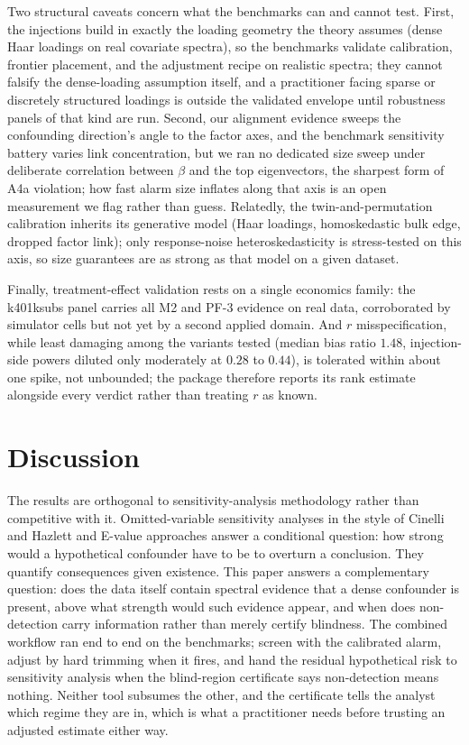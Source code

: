Two structural caveats concern what the benchmarks can and cannot test. First, the injections build in exactly the loading geometry the theory assumes (dense Haar loadings on real covariate spectra), so the benchmarks validate calibration, frontier placement, and the adjustment recipe on realistic spectra; they cannot falsify the dense-loading assumption itself, and a practitioner facing sparse or discretely structured loadings is outside the validated envelope until robustness panels of that kind are run. Second, our alignment evidence sweeps the confounding direction's angle to the factor axes, and the benchmark sensitivity battery varies link concentration, but we ran no dedicated size sweep under deliberate correlation between $\beta$ and the top eigenvectors, the sharpest form of A4a violation; how fast alarm size inflates along that axis is an open measurement we flag rather than guess. Relatedly, the twin-and-permutation calibration inherits its generative model (Haar loadings, homoskedastic bulk edge, dropped factor link); only response-noise heteroskedasticity is stress-tested on this axis, so size guarantees are as strong as that model on a given dataset.

Finally, treatment-effect validation rests on a single economics family: the k401ksubs panel carries all M2 and PF-3 evidence on real data, corroborated by simulator cells but not yet by a second applied domain. And $r$ misspecification, while least damaging among the variants tested (median bias ratio $1.48$, injection-side powers diluted only moderately at $0.28$ to $0.44$), is tolerated within about one spike, not unbounded; the package therefore reports its rank estimate alongside every verdict rather than treating $r$ as known.

\section{Discussion}
\label{sec:discussion}

The results are orthogonal to sensitivity-analysis methodology rather than competitive with it. Omitted-variable sensitivity analyses in the style of Cinelli and Hazlett \citep{cinelli2020making} and E-value approaches \citep{vanderweele2017evalue} answer a conditional question: how strong would a hypothetical confounder have to be to overturn a conclusion. They quantify consequences given existence. This paper answers a complementary question: does the data itself contain spectral evidence that a dense confounder is present, above what strength would such evidence appear, and when does non-detection carry information rather than merely certify blindness. The combined workflow ran end to end on the benchmarks; screen with the calibrated alarm, adjust by hard trimming when it fires, and hand the residual hypothetical risk to sensitivity analysis when the blind-region certificate says non-detection means nothing. Neither tool subsumes the other, and the certificate tells the analyst which regime they are in, which is what a practitioner needs before trusting an adjusted estimate either way.

